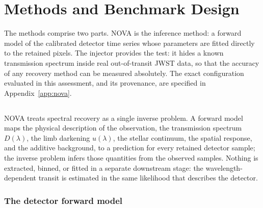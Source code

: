 \section{Methods and Benchmark Design}
\label{sec:methods}


The methods comprise two parts. NOVA is the inference method: a forward
model of the calibrated detector time series whose parameters are fitted
directly to the retained pixels. The injector provides the test: it hides
a known transmission spectrum inside real out-of-transit JWST data, so
that the accuracy of any recovery method can be measured absolutely. The
exact configuration evaluated in this assessment, and its provenance, are
specified in Appendix~\ref{app:nova}.

\subsection{\nova{}}


NOVA treats spectral recovery as a single inverse problem. A forward
model maps the physical description of the observation, the transmission
spectrum $D(\lambda)$, the limb darkening $u(\lambda)$, the stellar
continuum, the spatial response, and the additive background, to a
prediction for every retained detector sample; the inverse problem infers
those quantities from the observed samples. Nothing is extracted, binned,
or fitted in a separate downstream stage: the wavelength-dependent
transit is estimated in the same likelihood that describes the detector.

\subsubsection{The detector forward model}


